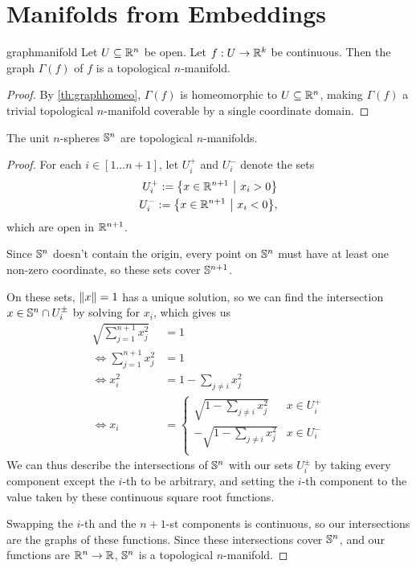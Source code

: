 \section{Manifolds from Embeddings}
\begin{importanttheorem}{}{graphmanifold}
	Let $U \subseteq \mathbb{R}^n$ be open. Let $f : U \to \mathbb{R}^k$ be continuous. Then the graph $\Gamma(f)$ of $f$ is a topological $n$-manifold.
\end{importanttheorem}
\begin{proof}
	By \ref{th:graphhomeo}, $\Gamma(f)$ is homeomorphic to $U \subseteq \mathbb{R}^n$, making $\Gamma(f)$ a trivial topological $n$-manifold coverable by a single coordinate domain.
\end{proof}
\begin{importanttheorem}{}{}
	The unit $n$-spheres $\mathbb{S}^n$ are topological $n$-manifolds.
\end{importanttheorem}
\begin{proof}
	For each $i \in [1...n+1]$, let $U_i^+$ and $U_i^-$ denote the sets 
	\begin{align*}
		U_i^+ := \qty{x \in \mathbb{R}^{n+1} ~\middle|~x_i > 0}\\
		U_i^- := \qty{x \in \mathbb{R}^{n+1} ~\middle|~x_i < 0},
	\end{align*}
	which are open in $\mathbb{R}^{n+1}$.
	
	Since $\mathbb{S}^n$ doesn't contain the origin, every point on $\mathbb{S}^n$ must have at least one non-zero coordinate, so these sets cover $\mathbb{S}^{n+1}$. 
	
	On these sets, $\norm{x} = 1$ has a unique solution, so we can find the intersection $x \in \mathbb{S}^n \cap U_i^{\pm}$ by solving for $x_i$, which gives us
	\begin{align*}
		\sqrt{\sum_{j = 1}^{n+1} x_j^2} &= 1\\
		\Leftrightarrow 
		\sum_{j = 1}^{n+1} x_j^2 &= 1\\
		\Leftrightarrow 
		x_i^2 &= 1 - \sum_{j \neq i} x_j^2\\
		\Leftrightarrow 
		x_i &= 
		\begin{cases}
			\sqrt{1 - \sum_{j \neq i} x_j^2} & x \in U_i^+\\
			-\sqrt{1 - \sum_{j \neq i} x_j^2} & x \in U_i^-\\
		\end{cases}
	\end{align*}
	We can thus describe the intersections of $\mathbb{S}^n$ with our sets $U_i^\pm$ by taking every component except the $i$-th to be arbitrary, and setting the $i$-th component to the value taken by these continuous square root functions. 
	
	Swapping the $i$-th and the $n+1$-st components is continuous, so our intersections are the graphs of these functions. Since these intersections cover $\mathbb{S}^n$, and our functions are $\mathbb{R}^n \to \mathbb{R}$, $\mathbb{S}^n$ is a topological $n$-manifold.
\end{proof}	

